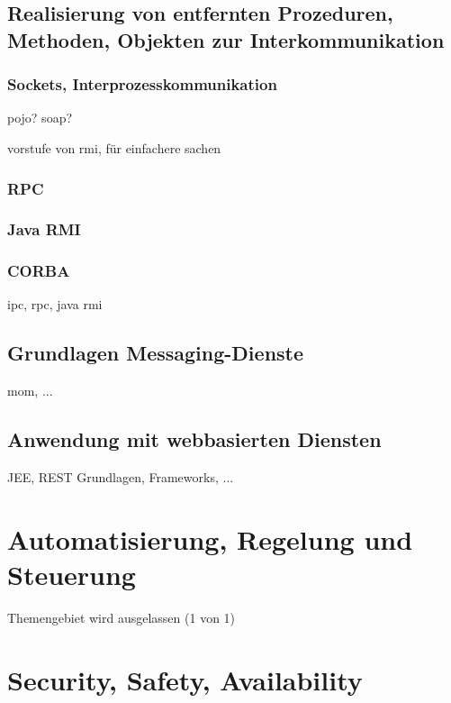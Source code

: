 \documentclass[letterpaper, 12pt]{article}
\let\tempsection\section
\renewcommand\section[1]{\vspace{-0.3cm}\tempsection{#1}\vspace{-0.3cm}}
\let\tempsubsection\subsection
\renewcommand\subsection[1]{\vspace{0cm}\tempsubsection{#1}\vspace{0cm}}
\let\tempsubsubsection\subsubsection
\renewcommand\subsubsection[1]{\vspace{0cm}\tempsubsubsection{#1}\vspace{0cm}}
\begin{document}
\subsection{Realisierung von entfernten Prozeduren, Methoden, Objekten zur Interkommunikation}

\subsubsection{Sockets, Interprozesskommunikation}

pojo? soap?

vorstufe von rmi, für einfachere sachen

\subsubsection{RPC}

\subsubsection{Java RMI}

\subsubsection{CORBA}

ipc, rpc, java rmi

\subsection{Grundlagen Messaging-Dienste}

mom, ...

\subsection{Anwendung mit webbasierten Diensten}

JEE, REST Grundlagen, Frameworks, ...

\clearpage

\section{Automatisierung, Regelung und Steuerung}

Themengebiet wird ausgelassen (1 von 1)

\clearpage

\section{Security, Safety, Availability}
\end{document}
